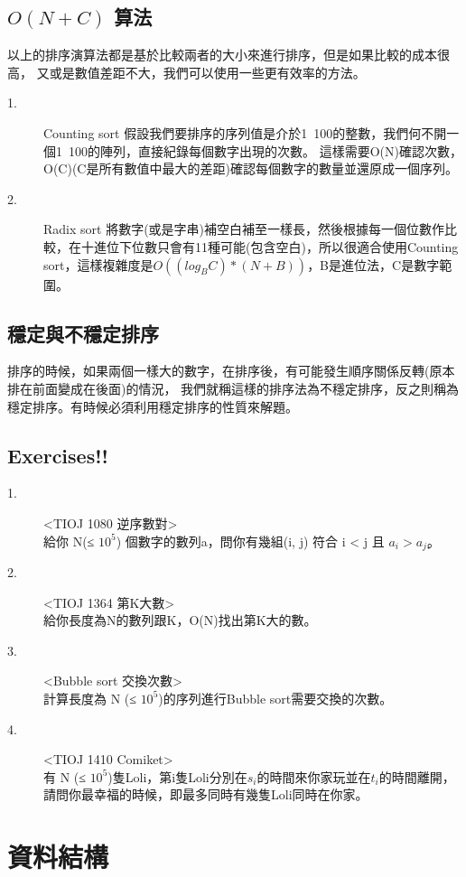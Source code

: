 \documentclass{article}
\begin{document}
\subsection{ $O(N + C)$ 算法}
以上的排序演算法都是基於比較兩者的大小來進行排序，但是如果比較的成本很高，
又或是數值差距不大，我們可以使用一些更有效率的方法。
\begin{description}
\item[ 1.]Counting sort
假設我們要排序的序列值是介於1~100的整數，我們何不開一個1~100的陣列，直接紀錄每個數字出現的次數。
這樣需要O(N)確認次數，O(C)(C是所有數值中最大的差距)確認每個數字的數量並還原成一個序列。
\item[ 2.]Radix sort
將數字(或是字串)補空白補至一樣長，然後根據每一個位數作比較，在十進位下位數只會有11種可能(包含空白)，所以很適合使用Counting sort，這樣複雜度是$O((log_B C) * (N + B))$，B是進位法，C是數字範圍。
\end{description} 

\subsection{穩定與不穩定排序}
排序的時候，如果兩個一樣大的數字，在排序後，有可能發生順序關係反轉(原本排在前面變成在後面)的情況，
我們就稱這樣的排序法為不穩定排序，反之則稱為穩定排序。有時候必須利用穩定排序的性質來解題。


\subsection{Exercises!!}
\begin{description}
\item[ 1.]<TIOJ 1080 逆序數對>\\
給你 N(≤ $10^5$) 個數字的數列a，問你有幾組(i, j) 符合 i < j 且 $a_i > a_jׇ$。
\item[ 2.]<TIOJ 1364 第K大數>\\
給你長度為N的數列跟K，O(N)找出第K大的數。
\item[ 3.]<Bubble sort 交換次數>\\
計算長度為 N (≤ $10^5$)的序列進行Bubble sort需要交換的次數。
\item[ 4.]<TIOJ 1410 Comiket>\\
有 N (≤ $10^5$)隻Loli，第i隻Loli分別在$s_i$的時間來你家玩並在$t_i$的時間離開，請問你最幸福的時候，即最多同時有幾隻Loli同時在你家。

\end{description} 


\section{資料結構}
\end{document}
